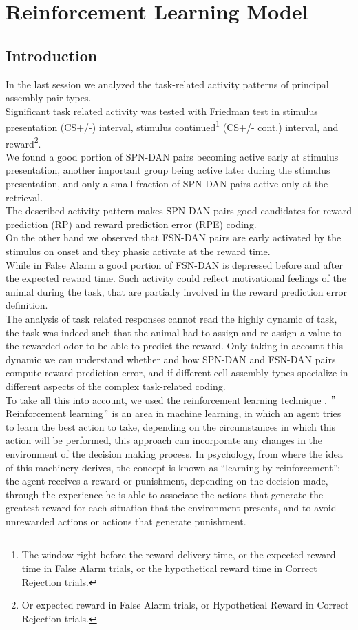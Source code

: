 \chapter{Reinforcement Learning Model}
\label{chap:RLModel}
\section{Introduction}
In the last session we analyzed the task-related activity patterns of principal assembly-pair types.\\Significant task related activity was tested with Friedman test in stimulus presentation (CS+/-) interval, stimulus continued\footnote{The window right before the reward delivery time, or the expected reward time in False Alarm trials, or the hypothetical reward time in Correct Rejection trials.} (CS+/- cont.) interval, and reward\footnote{Or expected reward in False Alarm trials, or Hypothetical Reward in Correct Rejection trials.}.\\We found a good portion of SPN-DAN pairs becoming active early at stimulus presentation, another important group being active later during the stimulus presentation, and only a small fraction of SPN-DAN pairs active only at the retrieval.\\The described activity pattern makes SPN-DAN pairs good candidates for reward prediction (RP) and reward prediction error (RPE) coding.\\On the other hand we observed that FSN-DAN pairs are early activated by the stimulus on onset and they phasic activate at the reward time.\\While in False Alarm a good portion of FSN-DAN is depressed before and after the expected reward time. Such activity could reflect motivational feelings of the animal during the task, that are partially involved in the reward prediction error definition.\\The analysis of task related responses cannot read the highly dynamic of task, the task was indeed such that the animal had to assign and re-assign a value to the rewarded odor to be able to predict the reward. Only taking in account this dynamic we can understand whether and how SPN-DAN and FSN-DAN pairs compute reward prediction error, and if different cell-assembly types specialize in different aspects of the complex task-related coding.\\To take all this into account, we used the reinforcement learning technique \cite{SuttonBarto}. $"$Reinforcement learning$"$ is an area in machine learning, in which an agent tries to learn the best action to take, depending on the circumstances in which this action will be performed, this approach can incorporate any changes in the environment of the decision making process. In psychology, from where the idea of this machinery derives, the concept is known as “learning by reinforcement”: the agent receives a reward or punishment, depending on the decision made, through the experience he is able to associate the actions that generate the greatest reward for each situation that the environment presents, and to avoid unrewarded actions or actions that generate punishment.\\
